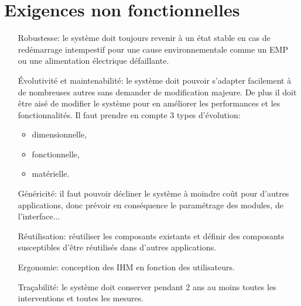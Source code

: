\section{Exigences non fonctionnelles}
    \begin{itemize}
        \item[Robustesse:] le système doit toujours revenir à un état
            stable en cas de redémarrage intempestif pour une cause
            environnementale comme un EMP ou une alimentation électrique
            défaillante.
    
        \item[Évolutivité et maintenabilité:] le système doit pouvoir
            s'adapter facilement à de nombreuses autres sans demander de
            modification majeure.
            De plus il doit être aisé de modifier le système pour en
            améliorer les performances et les fonctionnalités.
            Il faut prendre en compte 3 types d'évolution:
            \begin{itemize}
                \item dimensionnelle,
                \item fonctionnelle,
                \item matérielle.
            \end{itemize}

        \item[Généricité:] il faut pouvoir décliner le système à moindre
            coût pour d'autres applications, donc prévoir en conséquence
            le paramétrage des modules, de l'interface...

        \item[Réutilisation:] réutiliser les composants existants et
            définir des composants susceptibles d'être réutilisés dans
            d'autres applications.

        \item[Ergonomie:] conception des IHM en fonction des
            utilisateurs.

        \item[Traçabilité:] le système doit conserver pendant 2 ans au
            moins toutes les interventions et toutes les mesures.
    \end{itemize}


